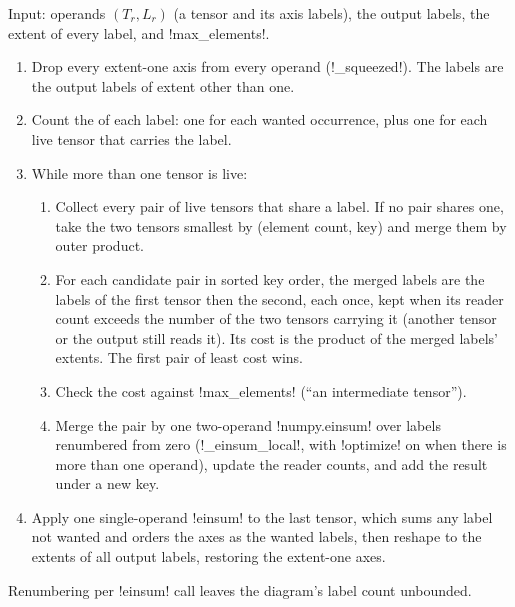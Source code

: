 \begin{algorithm}\label{alg:semantics-network}
Input: operands $(T_r,L_r)$ (a tensor and its axis labels), the output labels, the extent of every label, and \py!max_elements!.
\begin{enumerate}
\item Drop every extent-one axis from every operand (\py!_squeezed!). The  labels are the output labels of extent other than one.
\item Count the  of each label: one for each wanted occurrence, plus one for each live tensor that carries the label.
\item While more than one tensor is live:
  \begin{enumerate}
  \item Collect every pair of live tensors that share a label. If no pair shares one, take the two tensors smallest by (element count, key) and merge them by outer product.
  \item For each candidate pair in sorted key order, the merged labels are the labels of the first tensor then the second, each once, kept when its reader count exceeds the number of the two tensors carrying it (another tensor or the output still reads it). Its cost is the product of the merged labels' extents. The first pair of least cost wins.
  \item Check the cost against \py!max_elements! (``an intermediate tensor'').
  \item Merge the pair by one two-operand \py!numpy.einsum! over labels renumbered from zero (\py!_einsum_local!, with \py!optimize! on when there is more than one operand), update the reader counts, and add the result under a new key.
  \end{enumerate}
\item Apply one single-operand \py!einsum! to the last tensor, which sums any label not wanted and orders the axes as the wanted labels, then reshape to the extents of all output labels, restoring the extent-one axes.
\end{enumerate}
Renumbering per \py!einsum! call leaves the diagram's label count unbounded.
\end{algorithm}

